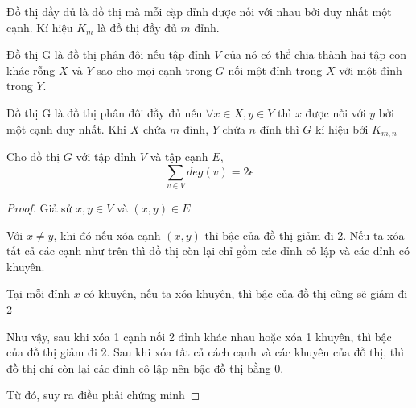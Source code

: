\begin{definition}
    Đồ thị đầy đủ là đồ thị mà mỗi cặp đỉnh được nối với nhau bởi duy nhất một cạnh. Kí hiệu $K_m$ là đồ thị đầy đủ $m$ đỉnh.

    Đồ thị G là đồ thị phân đôi nếu tập đỉnh $V$ của nó có thể chia thành hai tập con khác rỗng $X$ và $Y$ sao cho mọi cạnh trong $G$ nối một đỉnh trong $X$ với một đỉnh trong $Y$.

    Đồ thị G là đồ thị phân đôi đầy đủ nễu $\forall x \in X, y \in Y$ thì $x$ được nối với $y$ bởi một cạnh duy nhất.
    Khi $X$ chứa $m$ đỉnh, $Y$ chứa $n$ đỉnh thì $G$ kí hiệu bởi $K_{m,n}$
    \begin{center}
        \hspace{2cm}
    \end{center}
\end{definition}
\begin{theorem}
    \label{thr:v2e}
    Cho đồ thị $G$ với tập đỉnh $V$ và tập cạnh $E$, $$\sum_{v\in V}deg(v) = 2\epsilon$$
\end{theorem}
\begin{proof}

    Giả sử $x,y \in V$ và $(x,y) \in E$

    \indent Với $x \neq y$, khi đó nếu xóa cạnh $(x,y)$ thì bậc của đồ thị giảm đi 2. Nếu ta xóa tất cả các cạnh như trên thì đồ thị còn lại chỉ gồm các đỉnh cô lập và các đỉnh có khuyên.

    Tại mỗi đỉnh $x$ có khuyên, nếu ta xóa khuyên, thì bậc của đồ thị cũng sẽ giảm đi 2

    Như vậy, sau khi xóa 1 cạnh nối 2 đỉnh khác nhau hoặc xóa 1 khuyên, thì bậc của đồ thị giảm đi 2. Sau khi xóa tất cả cách cạnh và các khuyên của đồ thị, thì đồ thị chỉ còn lại các đỉnh cô lập nên bậc đồ thị bằng 0.

    Từ đó, suy ra điều phải chứng minh
\end{proof}
